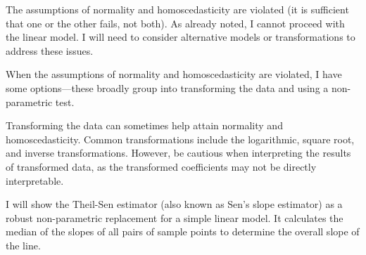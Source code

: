 \documentclass[
  letterpaper,
]{book}
\begin{document}
The assumptions of normality and homoscedasticity are violated (it is
sufficient that one or the other fails, not both). As already noted, I
cannot proceed with the linear model. I will need to consider
alternative models or transformations to address these issues.

When the assumptions of normality and homoscedasticity are violated, I
have some options---these broadly group into transforming the data and
using a non-parametric test.

Transforming the data can sometimes help attain normality and
homoscedasticity. Common transformations include the logarithmic, square
root, and inverse transformations. However, be cautious when
interpreting the results of transformed data, as the transformed
coefficients may not be directly interpretable.

I will show the Theil-Sen estimator (also known as Sen's slope
estimator) as a robust non-parametric replacement for a simple linear
model. It calculates the median of the slopes of all pairs of sample
points to determine the overall slope of the line.
\end{document}
